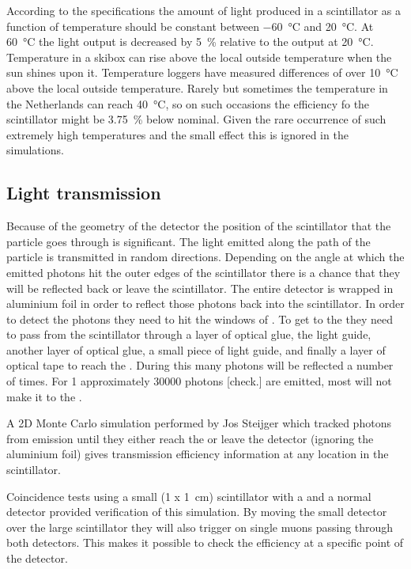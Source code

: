 According to the specifications the amount of light produced in a
scintillator as a function of temperature should be constant between
\SI{-60}{\degreeCelsius} and \SI{20}{\degreeCelsius}. At
\SI{60}{\degreeCelsius} the light output is decreased by
\SI{5}{\percent} relative to the output at \SI{20}{\degreeCelsius}.
Temperature in a skibox can rise above the local outside temperature
when the sun shines upon it. Temperature loggers have measured
differences of over \SI{10}{\degreeCelsius} above the local outside
temperature. Rarely but sometimes the temperature in the Netherlands can
reach \SI{40}{\degreeCelsius}, so on such occasions the efficiency fo
the scintillator might be \SI{3.75}{\percent} below nominal. Given the
rare occurrence of such extremely high temperatures and the small effect
this is ignored in the simulations.


\subsection{Light transmission}

Because of the geometry of the detector the position of the scintillator
that the particle goes through is significant. The light emitted along
the path of the particle is transmitted in random directions. Depending
on the angle at which the emitted photons hit the outer edges of the
scintillator there is a chance that they will be reflected back or leave
the scintillator. The entire detector is wrapped in aluminium foil in
order to reflect those photons back into the scintillator. In order to
detect the photons they need to hit the windows of \pmt. To get to the
\pmt they need to pass from the scintillator through a layer of optical
glue, the light guide, another layer of optical glue, a small piece of
light guide, and finally a layer of optical tape to reach the \pmt.
During this many photons will be reflected a number of times. For
\SI{1}{\mip} approximately 30000 photons [check.] are emitted, most will
not make it to the \pmt.

A 2D Monte Carlo simulation performed by Jos Steijger which tracked
photons from emission until they either reach the \pmt or leave the
detector (ignoring the aluminium foil) gives transmission efficiency
information at any location in the scintillator.

Coincidence tests using a small (\SI[product-units = repeat]{1 x
1}{\centi\meter}) scintillator with a \pmt and a normal \hisparc
detector provided verification of this simulation. By moving the small
detector over the large scintillator they will also trigger on single
muons passing through both detectors. This makes it possible to check
the efficiency at a specific point of the detector.

